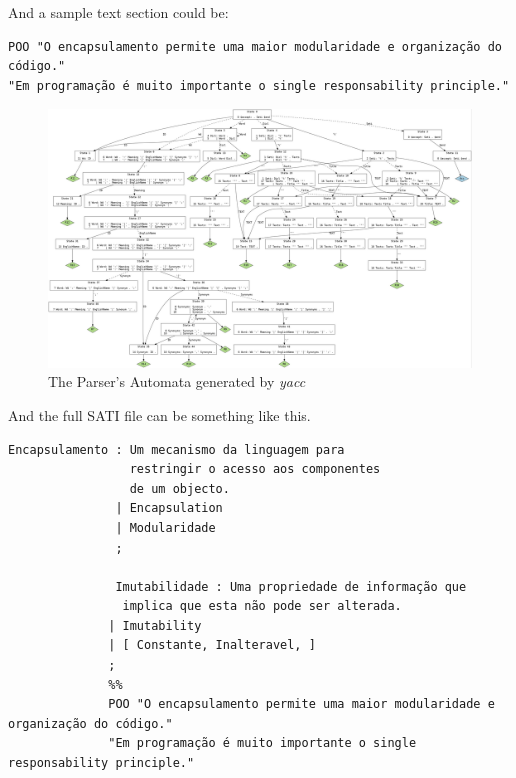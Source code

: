 \documentclass[a4paper]{report}
\begin{document}
And a sample text section could be:

\begin{verbatim}
POO "O encapsulamento permite uma maior modularidade e organização do código."
"Em programação é muito importante o single responsability principle."
\end{verbatim}

\begin{landscape}
    \begin{figure}[p]
        \includegraphics[height=\textwidth]{./sati.jpg}
        \caption{The Parser's Automata generated by \textit{yacc}}
    \end{figure}
\end{landscape}

And the full SATI file can be something like this.

\begin{verbatim}
Encapsulamento : Um mecanismo da linguagem para
                 restringir o acesso aos componentes
                 de um objecto.
               | Encapsulation
               | Modularidade
               ;

               Imutabilidade : Uma propriedade de informação que
                implica que esta não pode ser alterada.
              | Imutability
              | [ Constante, Inalteravel, ]
              ;
              %%
              POO "O encapsulamento permite uma maior modularidade e organização do código."
              "Em programação é muito importante o single responsability principle."
\end{verbatim}
\end{document}
